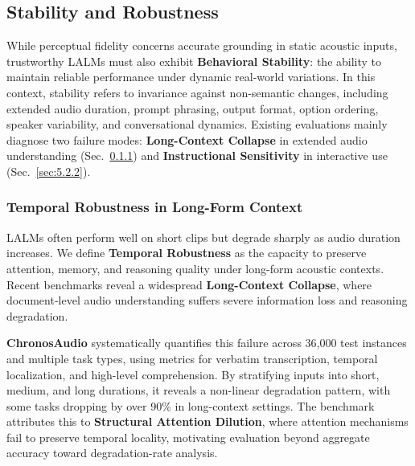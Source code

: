 
\subsection{Stability and Robustness}
\label{sec:5.2}

While perceptual fidelity concerns accurate grounding in static acoustic inputs, trustworthy LALMs must also exhibit \textbf{Behavioral Stability}: the ability to maintain reliable performance under dynamic real-world variations. In this context, stability refers to invariance against non-semantic changes, including extended audio duration, prompt phrasing, output format, option ordering, speaker variability, and conversational dynamics. Existing evaluations mainly diagnose two failure modes: \textbf{Long-Context Collapse} in extended audio understanding (Sec.~\ref{sec:5.2.1}) and \textbf{Instructional Sensitivity} in interactive use (Sec.~\ref{sec:5.2.2}).

\subsubsection{Temporal Robustness in Long-Form Context}
\label{sec:5.2.1}

LALMs often perform well on short clips but degrade sharply as audio duration increases. We define \textbf{Temporal Robustness} as the capacity to preserve attention, memory, and reasoning quality under long-form acoustic contexts. Recent benchmarks reveal a widespread \textbf{Long-Context Collapse}, where document-level audio understanding suffers severe information loss and reasoning degradation.

\textbf{ChronosAudio} \cite{luo2026chronosaudio} systematically quantifies this failure across 36,000 test instances and multiple task types, using metrics for verbatim transcription, temporal localization, and high-level comprehension. By stratifying inputs into short, medium, and long durations, it reveals a non-linear degradation pattern, with some tasks dropping by over 90\% in long-context settings. The benchmark attributes this to \textbf{Structural Attention Dilution}, where attention mechanisms fail to preserve temporal locality, motivating evaluation beyond aggregate accuracy toward degradation-rate analysis.

